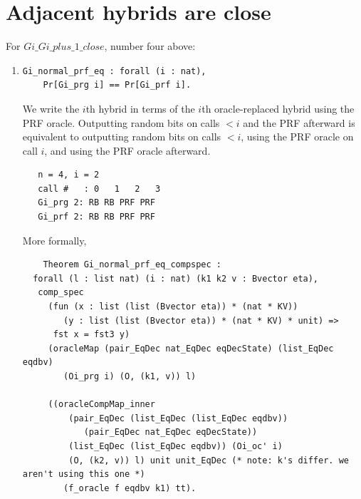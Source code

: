 \documentclass[12pt,lot, lof]{puthesis}
\begin{document}
{\begin{enumerate}
\end{enumerate} 


\section{Adjacent hybrids are close}

For $Gi\_Gi\_plus\_1\_close$, number four above:
\begin{enumerate}
\par
\item \begin{lstlisting}
Gi_normal_prf_eq : forall (i : nat),
    Pr[Gi_prg i] == Pr[Gi_prf i].
    \end{lstlisting}
    
    We write the $i$th hybrid in terms of the $i$th oracle-replaced hybrid using the PRF oracle. Outputting random bits on calls $< i$ and the PRF afterward is equivalent to outputting random bits on calls $< i$, using the PRF oracle on call $i$, and using the PRF oracle afterward. 
    \begin{lstlisting}
   n = 4, i = 2
   call #   : 0   1   2   3
   Gi_prg 2: RB RB PRF PRF
   Gi_prf 2: RB RB PRF PRF
    \end{lstlisting}
    
    More formally,
    \begin{lstlisting}
    Theorem Gi_normal_prf_eq_compspec :
  forall (l : list nat) (i : nat) (k1 k2 v : Bvector eta),
   comp_spec
     (fun (x : list (list (Bvector eta)) * (nat * KV))
        (y : list (list (Bvector eta)) * (nat * KV) * unit) =>
      fst x = fst3 y)
     (oracleMap (pair_EqDec nat_EqDec eqDecState) (list_EqDec eqdbv)
        (Oi_prg i) (O, (k1, v)) l)
        
     ((oracleCompMap_inner
         (pair_EqDec (list_EqDec (list_EqDec eqdbv))
            (pair_EqDec nat_EqDec eqDecState))
         (list_EqDec (list_EqDec eqdbv)) (Oi_oc' i) 
         (O, (k2, v)) l) unit unit_EqDec (* note: k's differ. we aren't using this one *)
        (f_oracle f eqdbv k1) tt).
    \end{lstlisting}
    

\end{enumerate}}
\end{document}
